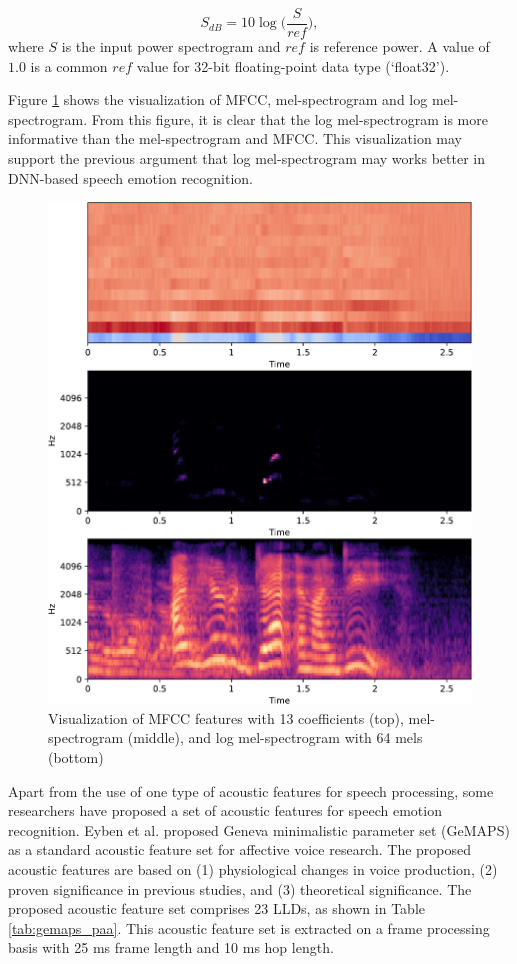 \begin{equation}
  S_{dB} = 10 \log \biggl( \frac {S}{ref}\biggr),
  \label{eq:log-mel}
\end{equation}
\noindent where $S$ is the input power spectrogram and $ref$ is reference
power. A value of $1.0$ is a common $ref$ value for 32-bit floating-point data
type (`float32').

Figure \ref{fig:mfcc-mel} shows the visualization of MFCC, mel-spectrogram and
log mel-spectrogram. From this figure, it is clear that the log mel-spectrogram
is more informative than the mel-spectrogram and MFCC. This visualization may
support the previous argument that log mel-spectrogram may works better in
DNN-based speech emotion recognition.

\begin{figure}[htbp]
  \centering
  \includegraphics[width=.7\textwidth]{../fig/mfcc-mel-crop.pdf}
\caption{Visualization of MFCC features with 13 coefficients (top),
mel-spectrogram (middle), and log mel-spectrogram with 64 mels (bottom)}
  \label{fig:mfcc-mel}
\end{figure}

Apart from the use of one type of acoustic features for speech processing, some
researchers have proposed a set of acoustic features for speech emotion
recognition. Eyben et al. \cite{Eyben} proposed Geneva minimalistic parameter
set (GeMAPS) as a standard acoustic feature set for affective voice research.
The proposed acoustic features are based on (1) physiological changes in voice
production, (2) proven significance in previous studies, and (3) theoretical
significance. The proposed acoustic feature set comprises 23 LLDs, as shown in
Table \ref{tab:gemaps_paa}. This acoustic feature set is extracted on a frame
processing basis with 25 ms frame length and 10 ms hop length.

